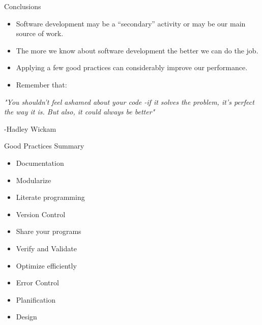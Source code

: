 \documentclass[ignorenonframetext,]{beamer}
\begin{document}
\begin{frame}{%
\protect\hypertarget{in-summary}{%
Conclusions}}

\begin{itemize}
\item
  Software development may be a “secondary” activity or may be our main
  source of work.
\item
  The more we know about software development the better we can do the
  job.
\item
  Applying a few good practices can considerably improve our
  performance.
\item
  Remember that:
\end{itemize}

\emph{"You shouldn’t feel ashamed about your code -if it solves the
problem, it’s perfect the way it is. But also, it could always be
better"}

-Hadley Wickam

\end{frame}

\begin{frame}{%
		\protect\hypertarget{summary}{%
			Good Practices Summary}}
	
	\begin{itemize}
		\item Documentation
		
		\item Modularize
		
		\item Literate programming
		
		\item Version Control
		
		\item Share your programs
		
		\item Verify and Validate
		
		\item Optimize efficiently
		
		\item Error Control
		
		\item Planification
		
		\item Design
		
	\end{itemize}
	
\end{frame}
	
\end{document}
